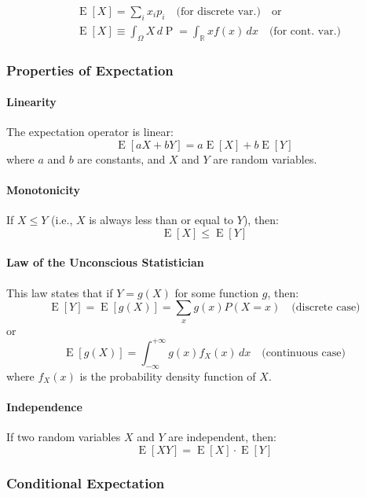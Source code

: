 \documentclass[8pt, a4paper, landscape, includeheadfoot]{extarticle}
\begin{document}
\begin{multicols*}{4}
	\begin{align*}
		 & \operatorname{E}[X] = \sum_i x_i p_i \quad \text{(for discrete var.)} \quad \text{or}                                        \\
		 & \operatorname{E}[X] \equiv \int_\Omega X \, d\operatorname{P} = \int_{\mathbb{R}} x f(x) \, dx \quad \text{(for cont. var.)}
	\end{align*}

	\subsubsection{Properties of Expectation}{}

	\paragraph{Linearity}
	The expectation operator is linear:
	$$
		\operatorname{E}[aX + bY] = a\operatorname{E}[X] + b\operatorname{E}[Y]
	$$
	where \(a\) and \(b\) are constants, and \(X\) and \(Y\) are random variables.

	\paragraph{Monotonicity}
	If \(X \leq Y\) (i.e., \(X\) is always less than or equal to \(Y\)), then:
	$$
		\operatorname{E}[X] \leq \operatorname{E}[Y]
	$$

	\paragraph{Law of the Unconscious Statistician}
	This law states that if \(Y = g(X)\) for some function \(g\), then:
	$$
		\operatorname{E}[Y] = \operatorname{E}[g(X)] = \sum_x g(x) P(X = x) \quad \text{(discrete case)}
	$$
	or
	$$
		\operatorname{E}[g(X)] = \int_{-\infty}^{+\infty} g(x) f_X(x) \, dx \quad \text{(continuous case)}
	$$
	where \(f_X(x)\) is the probability density function of \(X\).

	\paragraph{Independence}
	If two random variables \(X\) and \(Y\) are independent, then:
	$$
		\operatorname{E}[XY] = \operatorname{E}[X] \cdot \operatorname{E}[Y]
	$$

	\subsubsection{Conditional Expectation}{}


\end{multicols*}
\end{document}
